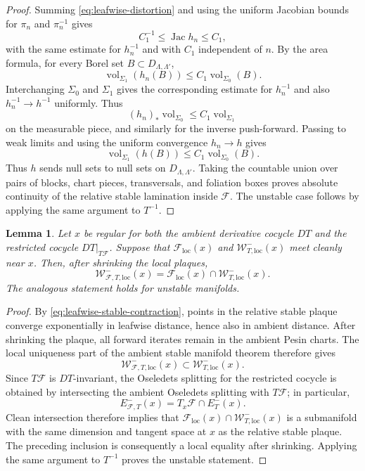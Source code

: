 \documentclass[11pt]{amsart}
\numberwithin{equation}{section}
\theoremstyle{plain}
\newtheorem{lem}[thm]{Lemma}
\begin{document}
\begin{proof}
Summing \eqref{eq:leafwise-distortion} and using the uniform Jacobian bounds
for $\pi_n$ and $\pi_n^{-1}$ gives
\begin{equation}\label{eq:leafwise-holonomy-jacobian}
 C_1^{-1}\le\operatorname{Jac}h_n\le C_1,
\end{equation}
with the same estimate for $h_n^{-1}$ and with $C_1$ independent of $n$.
By the area formula, for every Borel set
$B\subset D_{\Lambda,\Lambda'}$,
\[
 \operatorname{vol}_{\Sigma_1}(h_n(B))
 \le C_1\operatorname{vol}_{\Sigma_0}(B).
\]
Interchanging $\Sigma_0$ and $\Sigma_1$ gives the corresponding
estimate for $h_n^{-1}$ and also $h_n^{-1}\to h^{-1}$ uniformly.  Thus
\[
 (h_n)_*\operatorname{vol}_{\Sigma_0}
 \le C_1\operatorname{vol}_{\Sigma_1}
\]
on the measurable piece, and similarly for the inverse push-forward.
Passing to weak limits and using the uniform convergence $h_n\to h$ gives
\[
 \operatorname{vol}_{\Sigma_1}(h(B))
 \le C_1\operatorname{vol}_{\Sigma_0}(B).
\]
Thus $h$ sends null sets to null sets on
$D_{\Lambda,\Lambda'}$.  Taking the countable union over pairs of blocks,
chart pieces, transversals, and foliation boxes proves absolute continuity
of the relative stable lamination inside $\mathcal F$.  The unstable case
follows by applying the same argument to $T^{-1}$.
\end{proof}

\begin{lem}
\label{lem:app-relative-intersection}
Let $x$ be regular for both the ambient derivative cocycle $DT$ and the
restricted cocycle $DT|_{T\mathcal F}$.  Suppose that
$\mathcal F_{\mathrm{loc}}(x)$ and
$\mathcal W^-_{T,\mathrm{loc}}(x)$ meet cleanly near $x$.  Then, after
shrinking the local plaques,
\[
 \mathcal W^-_{\mathcal F,T,\mathrm{loc}}(x)
 =\mathcal F_{\mathrm{loc}}(x)
  \cap\mathcal W^-_{T,\mathrm{loc}}(x).
\]
The analogous statement holds for unstable manifolds.
\end{lem}

\begin{proof}
By \eqref{eq:leafwise-stable-contraction}, points in the relative stable
plaque converge exponentially in leafwise distance, hence also in ambient
distance.  After shrinking the plaque, all forward iterates remain in the
ambient Pesin charts.  The local uniqueness part of the ambient stable
manifold theorem therefore gives
\[
 \mathcal W^-_{\mathcal F,T,\mathrm{loc}}(x)
 \subset
 \mathcal W^-_{T,\mathrm{loc}}(x).
\]
Since $T\mathcal F$ is $DT$-invariant, the Oseledets splitting for the
restricted cocycle is obtained by intersecting the ambient Oseledets
splitting with $T\mathcal F$; in particular,
\[
 E^-_{\mathcal F,T}(x)=T_x\mathcal F\cap E^-_T(x).
\]
Clean intersection therefore implies that
$\mathcal F_{\mathrm{loc}}(x)\cap\mathcal W^-_{T,\mathrm{loc}}(x)$ is a
submanifold with the same dimension and tangent space at $x$ as the relative
stable plaque.  The preceding inclusion is consequently a local equality
after shrinking.  Applying the same argument to $T^{-1}$ proves the
unstable statement.
\end{proof}
\end{document}

